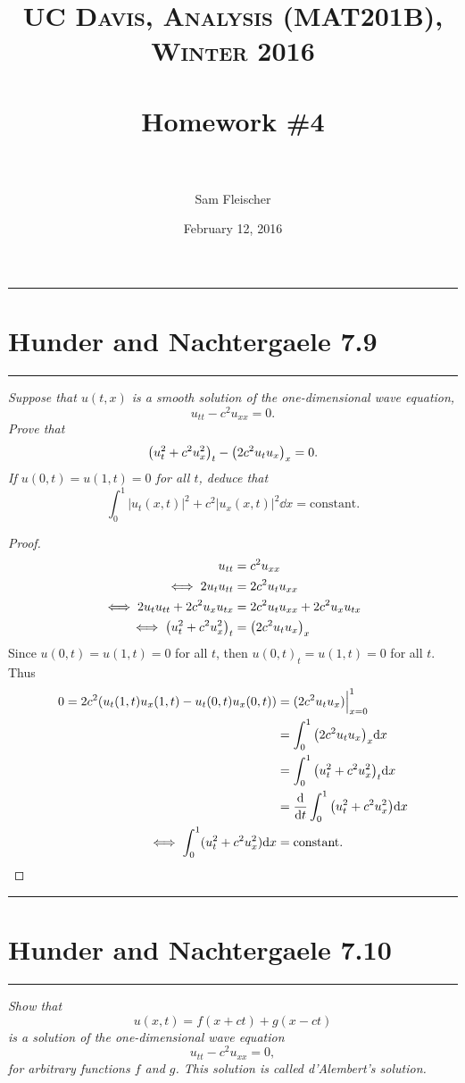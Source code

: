 \documentclass{article} %
\title{ 
\normalfont \normalsize 
\textsc{UC Davis, Analysis (MAT201B), Winter 2016} \\ [25pt] %
\horrule{2pt} \\[0.4cm] %
\Huge Homework \#4 \\ %
\horrule{2pt} \\[0.5cm] %
}
\author{\huge Sam Fleischer} %
\date{February 12, 2016} %
\theoremstyle{plain}
\newcommand{\problem}[1]{
\vspace{.375cm}
\begin{minipage}{\textwidth}
    \begin{center}
        \noindent\rule{5cm}{1pt}
    \end{center}
    \section{\bf #1}
    \begin{center}
        \noindent\rule{5cm}{1pt}
    \end{center}
    \vspace{0.25cm}
\end{minipage}
}
\numberwithin{equation}{section} %
\numberwithin{figure}{section} %
\numberwithin{table}{section} %
\begin{document}
\thispagestyle{empty}

\maketitle %

\makeatletter
{}
\makeatother

\pagebreak

\problem{Hunder and Nachtergaele 7.9}
\emph{Suppose that $u(t,x)$ is a smooth solution of the one-dimensional wave equation, $$u_{tt} - c^2 u_{xx} = 0.$$  Prove that $$\qty(u_t^2 + c^2 u_x^2)_t - \qty(2c^2 u_t u_x)_x = 0.$$  If $u(0, t) = u(1, t) = 0$ for all $t$, deduce that $$\int_0^1 |u_t(x,t)|^2 + c^2|u_x(x,t)|^2\dd x = \text{constant}.$$}

\begin{proof}
    \begin{align*}
        u_{tt} &= c^2 u_{xx} \\
        \iff 2u_tu_{tt} &= 2c^2 u_tu_{xx} \\
        \iff 2u_tu_{tt} + 2c^2 u_x u_{tx} &= 2c^2u_tu_{xx} + 2c^2 u_x u_{tx} \\
        \iff \qty(u_t^2 + c^2u_x^2)_t &= \qty(2c^2 u_t u_x)_x
    \end{align*}
    Since $u(0,t) = u(1,t) = 0$ for all $t$, then $u(0,t)_t = u(1,t) = 0$ for all $t$.  Thus
    \begin{align*}
        0 = 2c^2\qty(u_t(1,t)u_x(1,t) - u_t(0,t)u_x(0,t)) &= (2c^2 u_tu_x)\Big|_{x=0}^1 \\
        &= \int_0^1\qty(2c^2 u_t u_x)_x \dd x \\
        &= \int_0^1\qty(u_t^2 + c^2 u_x^2)_t\dd x \\
        &= \frac{\dd}{\dd t}\int_0^1\qty(u_t^2 + c^2 u_x^2)\dd x \\
        \iff \int_0^1 (u_t^2 + c^2 u_x^2)\dd x &= \text{constant}.
    \end{align*}
\end{proof}

\problem{Hunder and Nachtergaele 7.10}
\emph{Show that $$u(x,t) = f(x + ct) + g(x - ct)$$ is a solution of the one-dimensional wave equation $$u_{tt} - c^2u_{xx} = 0,$$ for arbitrary functions $f$ and $g$.  This solution is called \emph{d'Alembert's solution}.} \\
\end{document}

